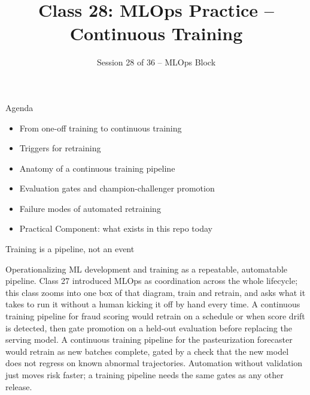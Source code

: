 

\title{Class 28: MLOps Practice -- Continuous Training}
\subtitle{Session 28 of 36 -- MLOps Block}
\author{\coursename}
\date{}



\frame{\titlepage \coursefooter}

\begin{frame}{Agenda}
\begin{itemize}
\item From one-off training to continuous training
\item Triggers for retraining
\item Anatomy of a continuous training pipeline
\item Evaluation gates and champion-challenger promotion
\item Failure modes of automated retraining
\item Practical Component: what exists in this repo today
\end{itemize}
\coursefooter
\end{frame}

\begin{frame}{Training is a pipeline, not an event}
\coursefooter
\end{frame}

\coursecontextframe
{Operationalizing ML development and training as a repeatable, automatable pipeline.}
{Class 27 introduced MLOps as coordination across the whole lifecycle; this class zooms into one box of that diagram, train and retrain, and asks what it takes to run it without a human kicking it off by hand every time.}
{A continuous training pipeline for fraud scoring would retrain on a schedule or when score drift is detected, then gate promotion on a held-out evaluation before replacing the serving model.}
{A continuous training pipeline for the pasteurization forecaster would retrain as new batches complete, gated by a check that the new model does not regress on known abnormal trajectories.}
{Automation without validation just moves risk faster; a training pipeline needs the same gates as any other release.}

